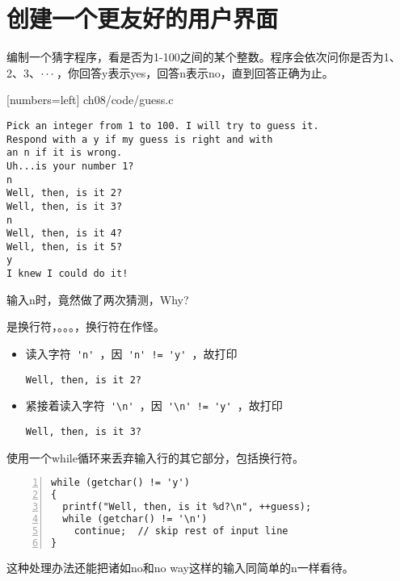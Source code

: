 \section{创建一个更友好的用户界面}
\begin{frame}[fragile]\ft{\secname}
编制一个猜字程序，看是否为1-100之间的某个整数。程序会依次问你是否为1、2、3、$\cdots$，你回答y表示yes，回答n表示no，直到回答正确为止。
\end{frame}


\begin{frame}\ft{\secname}
  
  [numbers=left]
  {ch08/code/guess.c}
\end{frame}

\begin{frame}[fragile]\ft{\secname}
\begin{lstlisting}[backgroundcolor=\color{blue!20}]
Pick an integer from 1 to 100. I will try to guess it.
Respond with a y if my guess is right and with
an n if it is wrong.
Uh...is your number 1?
n
Well, then, is it 2?
Well, then, is it 3?
n
Well, then, is it 4?
Well, then, is it 5?
y
I knew I could do it!
\end{lstlisting}
\end{frame}

\begin{frame}[fragile]\ft{\secname}
输入n时，竟然做了两次猜测，Why? \pause \vspace{0.1in}

是换行符，。。。，换行符在作怪。
\pause \vspace{0.1in}

\begin{itemize}
\item  读入字符\lstinline| 'n' |，因\lstinline| 'n' != 'y' |，故打印
\begin{lstlisting}
Well, then, is it 2?
\end{lstlisting}
\item 紧接着读入字符\lstinline| '\n' |，因\lstinline| '\n' != 'y' |，故打印
\begin{lstlisting}
Well, then, is it 3?
\end{lstlisting}
\end{itemize}
\end{frame}

\begin{frame}[fragile]
使用一个while循环来丢弃输入行的其它部分，包括换行符。
\begin{lstlisting}[numbers=left]
while (getchar() != 'y')
{
  printf("Well, then, is it %d?\n", ++guess);
  while (getchar() != '\n')
    continue;  // skip rest of input line
}
\end{lstlisting}
这种处理办法还能把诸如no和no way这样的输入同简单的n一样看待。
\end{frame}

